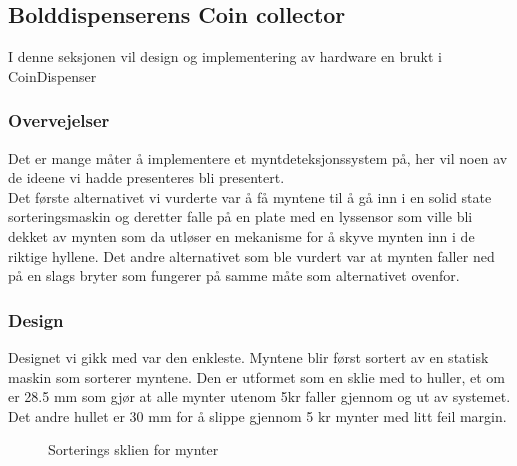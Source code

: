 \documentclass[HardwareDesign/HardwareDesign_main.tex]{subfiles}
\begin{document}
\subsection{Bolddispenserens Coin collector}\label{subsec:CoinCollector}
I denne seksjonen vil design og implementering av hardware en brukt i CoinDispenser
\subsubsection{Overvejelser}
Det er mange måter å implementere et myntdeteksjonssystem på, her vil noen av de ideene vi hadde presenteres bli presentert.\\
Det første alternativet vi vurderte var å få myntene til å gå inn i en solid state sorteringsmaskin og deretter falle på en plate med en lyssensor som ville bli dekket av mynten som da utløser en mekanisme for å skyve mynten inn i de riktige hyllene.
Det andre alternativet som ble vurdert var at mynten faller ned på en slags bryter som fungerer på samme måte som alternativet ovenfor.
\subsubsection{Design}\label{subsec:designAndDevelopment}
Designet vi gikk med var den enkleste.
Myntene blir først sortert av en statisk maskin som sorterer myntene. Den er utformet som en sklie med to huller, et om er 28.5 mm som gjør at alle mynter utenom 5kr faller gjennom og ut av systemet. Det andre hullet er 30 mm for å slippe gjennom 5 kr mynter med litt feil margin.

\begin{figure}[H]
    \centering
    \caption{Sorterings sklien for mynter}
\end{figure}
\end{document}
